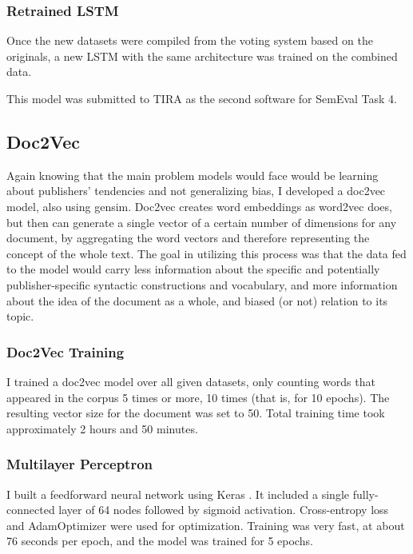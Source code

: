 \documentclass[11pt, a4paper]{article}
\begin{document}
\subsubsection{Retrained LSTM}

Once the new datasets were compiled from the voting system based on the originals, a new LSTM with the same architecture was trained on the combined data. 

This model was submitted to TIRA as the second software for SemEval Task 4.

\subsection{Doc2Vec}

Again knowing that the main problem models would face would be learning about publishers' tendencies and not generalizing bias, I developed a doc2vec model, also using gensim. Doc2vec creates word embeddings as word2vec does, but then can generate a single vector of a certain number of dimensions for any document, by aggregating the word vectors and therefore representing the concept of the whole text. The goal in utilizing this process was that the data fed to the model would carry less information about the specific and potentially publisher-specific syntactic constructions and vocabulary, and more information about the idea of the document as a whole, and biased (or not) relation to its topic.

\subsubsection{Doc2Vec Training}

I trained a doc2vec model over all given datasets, only counting words that appeared in the corpus 5 times or more, 10 times (that is, for 10 epochs). The resulting vector size for the document was set to 50. Total training time took approximately 2 hours and 50 minutes.

\subsubsection{Multilayer Perceptron}

I built a feedforward neural network using Keras \cite{chollet2015keras}. It included a single fully-connected layer of 64 nodes followed by sigmoid activation. Cross-entropy loss and AdamOptimizer were used for optimization. Training was very fast, at about 76 seconds per epoch, and the model was trained for 5 epochs.
\end{document}
